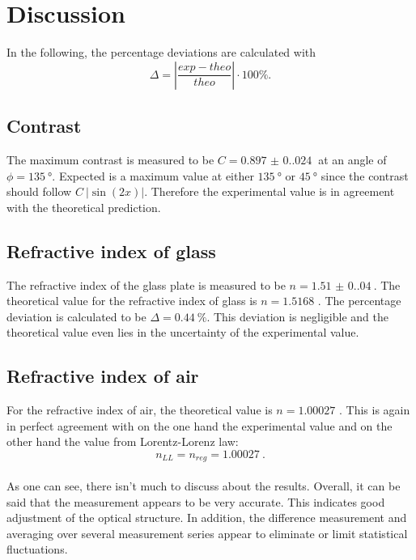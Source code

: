 \section{Discussion}
\label{sec:Discussion}
In the following, the percentage deviations are calculated with
\begin{equation}\label{eq:1}
    \Delta = |\frac{exp - theo}{theo}|\cdot 100\%.
\end{equation}

\subsection{Contrast}
The maximum contrast is measured to be $C = \SI{0.897(0.024)}{}$ at an angle of $\phi = \SI{135}{\degree}$.
Expected is a maximum value at either $\SI{135}{\degree}$ or $\SI{45}{\degree}$ since the 
contrast should follow $C ~ |\sin(2x)|$. Therefore the experimental value is in agreement with the theoretical prediction.

\subsection{Refractive index of glass}
The refractive index of the glass plate is measured to be $n = \SI{1.51(0.04)}{}$. The theoretical value for the refractive index of glass is $n = 1.5168$ \cite{n_glass}. The percentage deviation is calculated to be $\Delta = \SI{0.44}{\percent}$.
This deviation is negligible and the theoretical value even lies in the uncertainty of the experimental value.

\subsection{Refractive index of air}
For the refractive index of air, the theoretical value is $n = 1.00027$ \cite{n_air}. This is again in
perfect agreement with on the one hand the experimental value and on the other hand the value from Lorentz-Lorenz law:
\begin{equation*}
    n_{LL} = n_{reg} = \SI{1.00027}{}.
\end{equation*}
\\
As one can see, there isn't much to discuss about the results.
Overall, it can be said that the measurement appears to be very accurate. 
This indicates good adjustment of the optical structure. 
In addition, the difference measurement and averaging over several measurement series appear 
to eliminate or limit statistical fluctuations.

\newpage